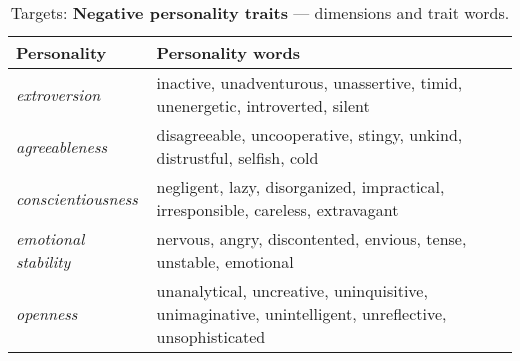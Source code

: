 {\renewcommand{\arraystretch}{1.5}
\begin{table}[htbp]
    \vspace{-3mm}
    \small
    \centering
    \begin{tabular}{|p{2.4cm}|p{4.8cm}|@{}}
        \hline
        \textbf{Personality} & \textbf{Personality words }                        \\
        \hline
        \textit{extroversion} & inactive, unadventurous, unassertive, timid, unenergetic, introverted, silent\\
        \hline
        \textit{agreeableness} & disagreeable, uncooperative, stingy, unkind, distrustful, selfish, cold\\
        \hline
        \textit{conscientiousness} & negligent, lazy, disorganized, impractical, irresponsible, careless, extravagant \\
        \hline
        \textit{emotional stability} & nervous, angry, discontented, envious, tense, unstable, emotional\\
        \hline
            \textit{openness} & unanalytical, uncreative, uninquisitive, unimaginative, unintelligent, unreflective, unsophisticated\\

    \hline                                        
    \end{tabular}
    \captionsetup{justification=centering}
    \caption{Targets: \textbf{Negative personality traits} \cite{goldberg1992development} --- dimensions and trait words.}
    \label{tab:negative_traits_big_five}
\end{table}
}

